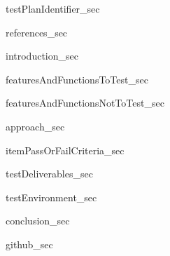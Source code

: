 {testPlanIdentifier_sec}

{references_sec}

{introduction_sec}

{featuresAndFunctionsToTest_sec}

{featuresAndFunctionsNotToTest_sec}

{approach_sec}

{itemPassOrFailCriteria_sec}

{testDeliverables_sec}

{testEnvironment_sec}

{conclusion_sec}

{github_sec}